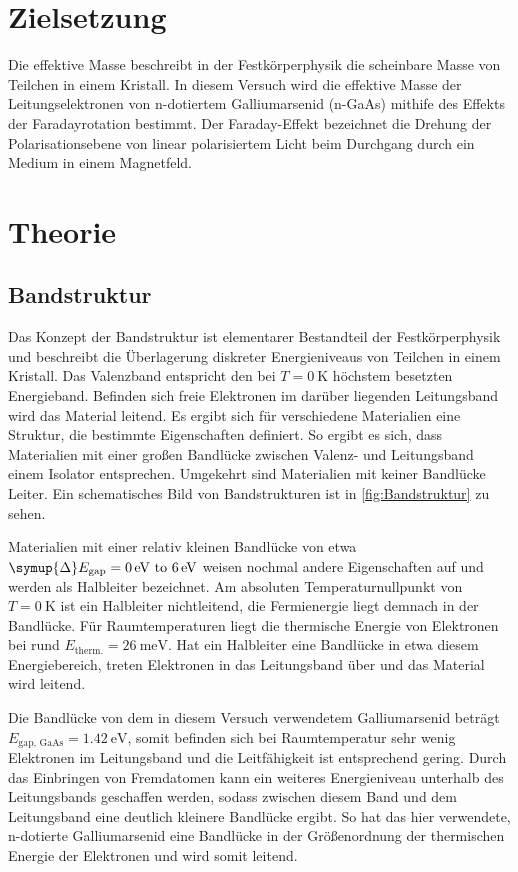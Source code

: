 \section{Zielsetzung}
\label{sec:Zielsetzung}
Die effektive Masse beschreibt in der Festkörperphysik die scheinbare Masse von Teilchen in einem Kristall. In diesem Versuch wird die effektive Masse der Leitungselektronen von
n-dotiertem Galliumarsenid (n-GaAs) mithife des Effekts der Faradayrotation bestimmt. Der Faraday-Effekt bezeichnet die Drehung der Polarisationsebene von linear polarisiertem Licht
beim Durchgang durch ein Medium in einem Magnetfeld.

\section{Theorie}
\label{sec:Theorie}
\subsection{Bandstruktur}
\label{subsec:Bandstruktur}
Das Konzept der Bandstruktur ist elementarer Bestandteil der Festkörperphysik und beschreibt die Überlagerung diskreter Energieniveaus von Teilchen in einem Kristall. Das Valenzband
entspricht den bei $T=\qty{0}{\kelvin}$ höchstem besetzten Energieband. Befinden sich freie Elektronen im darüber liegenden Leitungsband wird das Material leitend.
Es ergibt sich für verschiedene Materialien eine Struktur, die bestimmte Eigenschaften definiert. So ergibt es sich, dass Materialien mit einer großen Bandlücke zwischen 
Valenz- und Leitungsband einem Isolator entsprechen. Umgekehrt sind Materialien mit keiner Bandlücke Leiter. Ein schematisches Bild von Bandstrukturen ist in \autoref{fig:Bandstruktur}
zu sehen.

Materialien mit einer relativ kleinen Bandlücke von etwa $\symup{\Delta}E_{\text{gap}}=\qtyrange{0}{6}{\electronvolt}$ weisen nochmal andere Eigenschaften auf und werden als Halbleiter
bezeichnet. Am absoluten Temperaturnullpunkt von $T=\qty{0}{\kelvin}$ ist ein Halbleiter nichtleitend, die Fermienergie liegt demnach in der Bandlücke. Für Raumtemperaturen liegt die
thermische Energie von Elektronen bei rund $E_{\text{therm.}}=\qty{26}{\milli\electronvolt}$. Hat ein Halbleiter eine Bandlücke in etwa diesem Energiebereich, treten Elektronen in das 
Leitungsband über und das Material wird leitend.

Die Bandlücke von dem in diesem Versuch verwendetem Galliumarsenid beträgt $E_{\text{gap, GaAs}} = \qty{1,42}{\electronvolt}$, somit befinden sich bei Raumtemperatur sehr wenig 
Elektronen im Leitungsband und die Leitfähigkeit ist entsprechend gering. Durch das Einbringen von Fremdatomen kann ein weiteres Energieniveau unterhalb des Leitungsbands geschaffen werden,
sodass zwischen diesem Band und dem Leitungsband eine deutlich kleinere Bandlücke ergibt. So hat das hier verwendete, n-dotierte Galliumarsenid eine Bandlücke in der Größenordnung der
thermischen Energie der Elektronen und wird somit leitend. 

